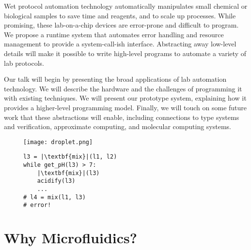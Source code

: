 \documentclass[
  10pt,
  a4paper,
  twocolumn,
]{article}
\title{\mytitle}
\author{\myauthors
\\ \small Paul G. Allen School for Computer Science and Engineering
\\ \small University of Washington}
\date{}
\begin{document}
\maketitle

Wet protocol automation technology automatically manipulates small chemical or biological samples to save time and reagents, and to scale up processes.
While promising, these lab-on-a-chip devices are error-prone and difficult to program.
We propose a runtime system that automates error handling and resource management to provide a system-call-ish interface.
Abstracting away low-level details will make it possible to write high-level programs to automate a variety of lab protocols.

Our talk will begin by presenting the broad applications of lab automation technology.
We will describe the hardware and the challenges of programming it with existing techniques.
We will present our prototype system, explaining how it provides a higher-level programming model.
Finally, we will touch on some future work that these abstractions will enable, including connections to type systems and verification, approximate computing, and molecular computing systems.

\begin{figure}[h]
  \begin{minipage}{0.4\linewidth}
    \footnotesize
    \centering
    \texttt{[image: droplet.png]}
  \end{minipage}
  \hfill
  \begin{minipage}{0.53\linewidth}
    \begin{verbatim}
l3 = |\textbf{mix}|(l1, l2)
while get_pH(l3) > 7:
    |\textbf{mix}|(l3)
    acidify(l3)
    ...
# l4 = mix(l1, l3)
# error!
    \end{verbatim}
  \end{minipage}
  \label{fig:board}
  \vspace{-1em}
  \label{fig:code}
  \vspace{-2em}
\end{figure}

\section*{Why Microfluidics?}
\end{document}
